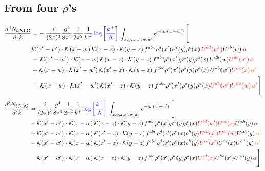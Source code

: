 \documentclass[9pt]{article}
\numberwithin{equation}{section}
\begin{document}
\subsection{From four $\rho$'s}
\begin{align}
    \frac{d^{3}N_{a\,\rm NLO}}{d^{3}k} & = -\,\frac{i}{(2\pi)^{3}}\frac{g^{4}}{8\pi^{3}}\frac{1}{2\pi^{2}} \frac{1}{k^{+}}\,{\color{blue}\log{\left[\frac{k^{+}}{\Lambda}\right]}}\,\int_{x,y,z,x^{\prime},w,w^{\prime}}e^{-ik\cdot (w-w')}\, \Bigg[\notag \\ &  \mathcal{K}(x'-w')\cdot \mathcal{K}(x-w)\, \mathcal{K}(x-z)\cdot \mathcal{K}(y-z)\, f^{a b c} \rho^{d}(x') \rho^{a}(y) \rho^{c}(x)\,{\color{red}U^{ed}(w')} U^{e b}(w)\, {\color{red} \alpha} \nonumber\\
    &  -\,\mathcal{K}(x'-w')\cdot \mathcal{K}(x-w)\, \mathcal{K}(x-z)\cdot \mathcal{K}(y-z)\, f^{a b c} \rho^{e}(x') \rho^{a}(y) \rho^{c}(x)\, U^{d b}(w) {\color{red}U^{de}(x')}\, {\color{red} \alpha}\nonumber\\
    & + \mathcal{K}(x-w)\cdot \mathcal{K}(x'-w')\, \mathcal{K}(x'-z)\cdot \mathcal{K}(y-z)\, f^{a b c} \rho^{c}(x') \rho^{a}(y) \rho^{e}(x)\,U^{d b}(w') {\color{red}U^{de}(x)}\, {\color{orange} \alpha'} \nonumber\\
    & -\,\mathcal{K}(x-w)\cdot \mathcal{K}(x'-w')\, \mathcal{K}(x'-z)\cdot \mathcal{K}(y-z)\, f^{a b c} \rho^{c}(x') \rho^{a}(y) \rho^{e}(x) {\color{red}U^{db}(w')} {\color{red}U^{de}(w)}\, {\color{orange} \alpha'}\Bigg]
\end{align}
\begin{align}
      \frac{d^{3}N_{b\,\rm NLO}}{d^{3}k} & = \frac{i}{(2\pi)^{3}}\frac{g^{4}}{8\pi^{3}}\frac{1}{2\pi^{2}} \frac{1}{k^{+}}\,{\color{blue}\log{\left[\frac{k^{+}}{\Lambda}\right]}}\,\int_{x,y,z,x^{\prime},w,w^{\prime}}e^{-ik\cdot (w-w')}\, \Bigg[\notag \\ & - \mathcal{K}(x'-w')\cdot \mathcal{K}(x-w)\, \mathcal{K}(x-z)\cdot \mathcal{K}(y-z)\, f^{a b c} \rho^{d}(x') \rho^{h}(y) \rho^{e}(x) {\color{red}U^{bd}(w')} {\color{red}U^{ce}(x)} U^{a h}(y)\, {\color{red} \alpha}\nonumber\\
    &+ \mathcal{K}(x'-w')\cdot \mathcal{K}(x-w)\,\mathcal{K}(x'-z)\cdot \mathcal{K}(y-z)\, f^{a b c} \rho^{d}(x') \rho^{e}(x) \rho^{h}(y) {\color{red}U^{cd}(x')} {\color{red}U^{be}(w)} U^{a h}(y)\, {\color{orange} \alpha'}\nonumber\\
    &- \mathcal{K}(x'-w')\cdot \mathcal{K}(x-w)\,\mathcal{K}(x'-z)\cdot \mathcal{K}(y-z)\, f^{a b c} \rho^{d}(x') \rho^{e}(x) \rho^{h}(y) {\color{red}U^{cd}(x')} U^{b e}(x) U^{a h}(y)\, {\color{orange} \alpha'}\nonumber\\
    &+  \mathcal{K}(x'-w')\cdot \mathcal{K}(x-w)\, \mathcal{K}(x-z)\cdot \mathcal{K}(y-z)\, f^{a b c} \rho^{e}(x') \rho^{h}(y) \rho^{d}(x) {\color{red}U^{cd}(x)} U^{b e}(x') U^{a h}(y)\, {\color{red} \alpha} \Bigg]
\end{align}
\end{document}
